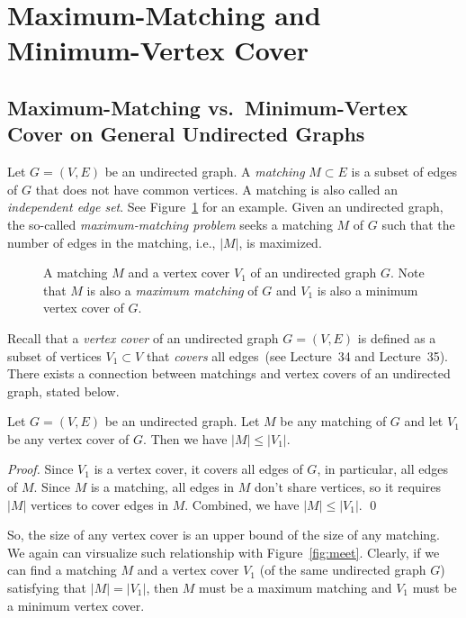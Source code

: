 \setcounter{definition}{0} \setcounter{property}{0} \setcounter{claim}{0} \setcounter{fact}{0} \setcounter{corollary}{0} \setcounter{figure}{0}
\section{Maximum-Matching and Minimum-Vertex Cover}

\subsection*{Maximum-Matching vs.\ Minimum-Vertex Cover on General Undirected Graphs}

Let $G = (V, E)$ be an undirected graph. A \emph{matching} $M \subset E$ 
is a subset of edges of $G$ that does not have common vertices.
A matching is also called an \emph{independent edge set}.
See Figure~\ref{fig:matching} for an example.
Given an undirected graph, the so-called \emph{maximum-matching problem}
seeks a matching $M$ of $G$ such that the number of edges in the matching, i.e., $|M|$, 
is maximized.

\begin{figure}[h]
\centering{}
\caption{A matching $M$ and a vertex cover $V_1$ of an undirected graph $G$. 
Note that $M$ is also a \emph{maximum matching} of $G$ and $V_1$ is also a minimum vertex cover of $G$.}
\label{fig:matching}
\end{figure}

Recall that a \emph{vertex cover} of an undirected graph $G = (V, E)$ is defined
as a subset of vertices $V_1\subset V$ that \emph{covers} all edges~(see Lecture~34 and Lecture~35).
There exists a connection between matchings and vertex covers of an undirected graph, stated below.

\begin{claim}
Let $G = (V, E)$ be an undirected graph. Let $M$ be any matching of $G$ and let $V_1$ be any vertex cover of $G$.
Then we have $|M| \le |V_1|$.
\end{claim}

\emph{Proof.} Since $V_1$ is a vertex cover, it covers all edges of $G$, in particular, all edges of $M$.
Since $M$ is a matching, all edges in $M$ don't share vertices, so it requires $|M|$ vertices to cover edges in $M$.
Combined, we have $|M| \le |V_1|$. \qed

So, the size of any vertex cover is an upper bound of the size of any matching. We again can virsualize
such relationship with Figure~\ref{fig:meet}. Clearly, if we can find a matching $M$ and a vertex cover $V_1$
(of the same undirected graph $G$) satisfying that $|M| = |V_1|$, then $M$ must be a maximum matching 
and $V_1$ must be a minimum vertex cover.


